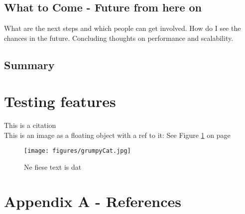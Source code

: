 \documentclass[12p]{scrartcl}
\begin{document}
\subsection{What to Come - Future from here on}
What are the next steps and which people can get involved. How do I see the chances in the future. Concluding thoughts on performance and scalability.
\subsection{Summary}


\section*{Testing features}
This is a citation \cite{Chang2008}\\
This is an image as a floating object with a ref to it: See Figure \ref{fig:fieseText} on page \pageref{fig:fieseText}
\begin{figure}[h]		
 	\texttt{[image: figures/grumpyCat.jpg]}
	\caption{Ne fiese text is dat}
	\label{fig:fieseText}
\end{figure}

\section*{Appendix A - References}


\end{document}
